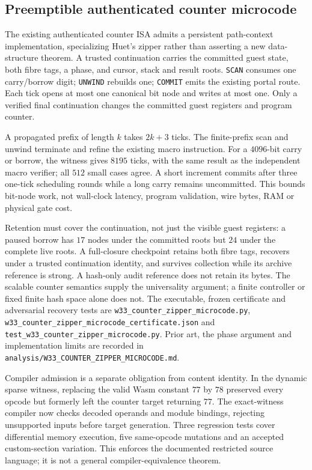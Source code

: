 \subsection{Preemptible authenticated counter microcode}
\label{ssec:counter-zipper-microcode}
The existing authenticated counter ISA admits a persistent path-context
implementation, specializing Huet's zipper rather than asserting a new
data-structure theorem. A trusted continuation carries the committed guest
state, both fibre tags, a phase, and cursor, stack and result roots.
\texttt{SCAN} consumes one carry/borrow digit; \texttt{UNWIND} rebuilds one;
\texttt{COMMIT} emits the existing portal route. Each tick opens at most one
canonical bit node and writes at most one. Only a verified final continuation
changes the committed guest registers and program counter.

A propagated prefix of length $k$ takes $2k+3$ ticks. The finite-prefix
scan and unwind terminate and refine the existing macro instruction.
For a $4096$-bit carry or borrow, the witness gives $8195$ ticks, with the
same result as the independent macro verifier; all $512$ small cases agree.
A short increment commits after three one-tick scheduling rounds while a
long carry remains uncommitted. This bounds bit-node work, not wall-clock
latency, program validation, wire bytes, RAM or physical gate cost.

Retention must cover the continuation, not just the visible guest registers:
a paused borrow has $17$ nodes under the committed roots but $24$ under the
complete live roots. A full-closure checkpoint retains both fibre tags,
recovers under a trusted continuation identity, and survives collection while
its archive reference is strong. A hash-only audit reference does not retain
its bytes. The scalable counter semantics supply the universality argument;
a finite controller or fixed finite hash space alone does not.
The executable, frozen certificate and adversarial recovery tests are
\texttt{w33\_counter\_zipper\_microcode.py},
\texttt{w33\_counter\_zipper\_microcode\_certificate.json} and
\texttt{test\_w33\_counter\_zipper\_microcode.py}.
Prior art, the phase argument and implementation limits are recorded in
\texttt{analysis/W33\_COUNTER\_ZIPPER\_MICROCODE.md}.

Compiler admission is a separate obligation from content identity. In the
dynamic sparse witness, replacing the valid Wasm constant $77$ by $78$
preserved every opcode but formerly left the counter target returning $77$.
The exact-witness compiler now checks decoded operands and module bindings,
rejecting unsupported inputs before target generation. Three regression tests
cover differential memory execution, five same-opcode mutations and an
accepted custom-section variation. This enforces the documented restricted
source language; it is not a general compiler-equivalence theorem.

